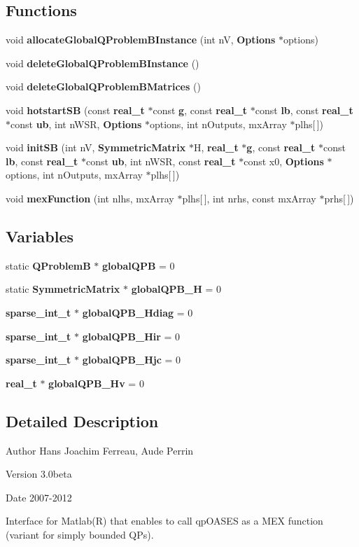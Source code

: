 \subsection*{Functions}
\begin{DoxyCompactItemize}
\item 
void {\bf allocateGlobalQProblemBInstance} (int nV, {\bf Options} $\ast$options)
\item 
void {\bf deleteGlobalQProblemBInstance} ()
\item 
void {\bf deleteGlobalQProblemBMatrices} ()
\item 
void {\bf hotstartSB} (const {\bf real\_\-t} $\ast$const {\bf g}, const {\bf real\_\-t} $\ast$const {\bf lb}, const {\bf real\_\-t} $\ast$const {\bf ub}, int nWSR, {\bf Options} $\ast$options, int nOutputs, mxArray $\ast$plhs[$\,$])
\item 
void {\bf initSB} (int nV, {\bf SymmetricMatrix} $\ast$H, {\bf real\_\-t} $\ast${\bf g}, const {\bf real\_\-t} $\ast$const {\bf lb}, const {\bf real\_\-t} $\ast$const {\bf ub}, int nWSR, const {\bf real\_\-t} $\ast$const x0, {\bf Options} $\ast$options, int nOutputs, mxArray $\ast$plhs[$\,$])
\item 
void {\bf mexFunction} (int nlhs, mxArray $\ast$plhs[$\,$], int nrhs, const mxArray $\ast$prhs[$\,$])
\end{DoxyCompactItemize}
\subsection*{Variables}
\begin{DoxyCompactItemize}
\item 
static {\bf QProblemB} $\ast$ {\bf globalQPB} = 0
\item 
static {\bf SymmetricMatrix} $\ast$ {\bf globalQPB\_\-H} = 0
\item 
{\bf sparse\_\-int\_\-t} $\ast$ {\bf globalQPB\_\-Hdiag} = 0
\item 
{\bf sparse\_\-int\_\-t} $\ast$ {\bf globalQPB\_\-Hir} = 0
\item 
{\bf sparse\_\-int\_\-t} $\ast$ {\bf globalQPB\_\-Hjc} = 0
\item 
{\bf real\_\-t} $\ast$ {\bf globalQPB\_\-Hv} = 0
\end{DoxyCompactItemize}


\subsection{Detailed Description}
\begin{DoxyAuthor}{Author}
Hans Joachim Ferreau, Aude Perrin 
\end{DoxyAuthor}
\begin{DoxyVersion}{Version}
3.0beta 
\end{DoxyVersion}
\begin{DoxyDate}{Date}
2007-\/2012
\end{DoxyDate}
Interface for Matlab(R) that enables to call qpOASES as a MEX function (variant for simply bounded QPs). 

